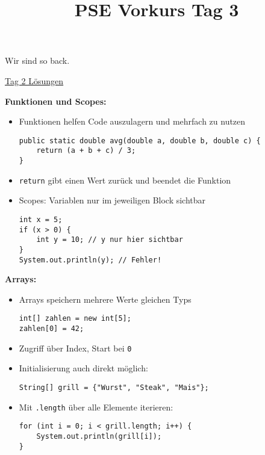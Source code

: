 \documentclass{../../sheet}
\title{PSE Vorkurs Tag 3}
\begin{document}
\maketitle
Wir sind so back.

\href{https://fius.de/wp-content/uploads/2025/10/Day2Musterloesung.zip}{Tag 2 Lösungen}

\textbf{Funktionen und Scopes:}
	\begin{itemize}
		\item Funktionen helfen Code auszulagern und mehrfach zu nutzen
		      \begin{verbatim}
public static double avg(double a, double b, double c) {
    return (a + b + c) / 3;
}
          \end{verbatim}
		\item \texttt{return} gibt einen Wert zurück und beendet die Funktion
		\item Scopes: Variablen nur im jeweiligen Block sichtbar
		      \begin{verbatim}
int x = 5;
if (x > 0) {
    int y = 10; // y nur hier sichtbar
}
System.out.println(y); // Fehler!
          \end{verbatim}
	\end{itemize}

    \textbf{Arrays:}
	
	\begin{itemize}
		\item Arrays speichern mehrere Werte gleichen Typs
		      \begin{verbatim}
int[] zahlen = new int[5];
zahlen[0] = 42;
          \end{verbatim}
		\item Zugriff über Index, Start bei \texttt{0}
		\item Initialisierung auch direkt möglich:
		      \begin{verbatim}
String[] grill = {"Wurst", "Steak", "Mais"};
          \end{verbatim}
		\item Mit \texttt{.length} über alle Elemente iterieren:
		      \begin{verbatim}
for (int i = 0; i < grill.length; i++) {
    System.out.println(grill[i]);
}
          \end{verbatim}
	\end{itemize}
\end{document}

